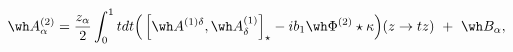 \begin{equation}
\wh A_\alpha^{(2)}  =  \frac{z_\alpha}2
\int_0^1 tdt \Big( \left[\wh A^{(1)\delta},\wh
A^{(1)}_\delta\right]_\star  -  
ib_1 \wh \Phi^{(2)}\star \kappa \Big) (z\to tz) \ + \ \wh B_\alpha, 
\end{equation}

